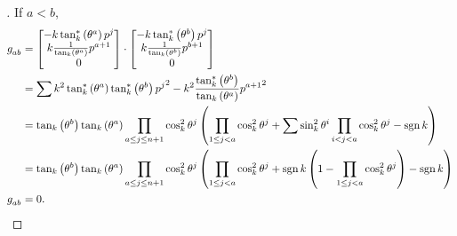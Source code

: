 \documentclass[../main.tex]{subfiles}
\begin{document}
\begin{proof}[]
    If $a<b$,
    \begin{align*}
        \tensor{g}{_a_b}
                         & =\begin{bmatrix}
                                -k\tan_k^\ast\left(\tensor{\theta}{^a}\right)\tensor{p}{^j}         \\
                                k\frac{1}{\tan_k\left(\tensor{\theta}{^a}\right)}\tensor{p}{^{a+1}} \\
                                0                                                                   \\
                            \end{bmatrix}\cdot\begin{bmatrix}
                                                  -k\tan_k^\ast\left(\tensor{\theta}{^b}\right)\tensor{p}{^j}         \\
                                                  k\frac{1}{\tan_k\left(\tensor{\theta}{^b}\right)}\tensor{p}{^{b+1}} \\
                                                  0                                                                   \\
                                              \end{bmatrix} \\
                         & =
        \sum{
            k^2\tan_k^\ast\left(\tensor{\theta}{^a}\right)\tan_k^\ast\left(\tensor{\theta}{^b}\right){\tensor{p}{^j}}^2
        }
        -k^2\frac{\tan_k^\ast\left(\tensor{\theta}{^b}\right)}{\tan_k\left(\tensor{\theta}{^a}\right)}{\tensor{p}{^{a+1}}}^2               \\
                         & =
        \tan_k\left(\tensor{\theta}{^b}\right)
        \tan_k\left(\tensor{\theta}{^a}\right)
        \prod_{a\le j\le n+1}{\cos_k^2\tensor{\theta}{^j}}
        \left(
        \prod_{1\le j<a}{\cos_k^2\tensor{\theta}{^j}}
        + \sum{
            \sin_k^2{\tensor{\theta}{^{i}}}\prod_{i<j<a}{\cos_k^2\tensor{\theta}{^j}}
        }
        -\sign{k}
        \right)                                                                                                                            \\
                         & =
        \tan_k\left(\tensor{\theta}{^b}\right)
        \tan_k\left(\tensor{\theta}{^a}\right)
        \prod_{a\le j\le n+1}{\cos_k^2\tensor{\theta}{^j}}
        \left(
        \prod_{1\le j<a}{\cos_k^2\tensor{\theta}{^j}}
        + \sign{k}\left(
        1-\prod_{1\le j<a}{\cos_k^2\tensor{\theta}{^j}}
        \right)
        - \sign{k}
        \right)                                                                                                                            \\
        \tensor{g}{_a_b} & = 0 \text{.}
    \end{align*}


\end{proof}
\end{document}
